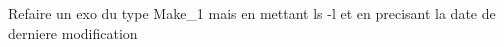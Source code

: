 
Refaire un exo du type Make_1 mais en 
mettant ls -l et en precisant la date de derniere modification
